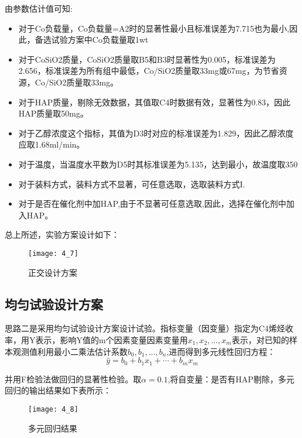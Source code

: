 \documentclass[withoutpreface,bwprint]{cumcmthesis} %
\begin{document}
由参数估计值可知:
\begin{itemize}
	\item 对于Co负载量，Co负载量=A2时的显著性最小且标准误差为7.715也为最小,因此，备选试验方案中Co负载量取1wt%
	\item 对于CoSiO2质量，CoSiO2质量取B5和B3时显著性为0.005，标准误差为2.656，标准误差为所有组中最低，Co/SiO2质量取33mg或67mg，为节省资源，Co/SiO2质量取33mg。
	
	\item 对于HAP质量，剔除无效数据，其值取C4时数据有效，显著性为0.83，因此HAP质量取50mg。
	
	\item 对于乙醇浓度这个指标，其值为D3时对应的标准误差为1.829，因此乙醇浓度应取1.68ml/min。
	
	\item 对于温度，当温度水平数为D5时其标准误差为5.135，达到最小，故温度取350
	
	\item 对于装料方式，装料方式不显著，可任意选取，选取装料方式I.
	
	\item 对于是否在催化剂中加HAP,由于不显著可任意选取,因此，选择在催化剂中加入HAP。	
\end{itemize}

总上所述，实验方案设计如下：
\begin{figure}[!h]
	\centering
	\texttt{[image: 4\_7]}
	\caption{正交设计方案}
	\label{fig:circuit-diagram1}
\end{figure}



\subsection{均匀试验设计方案}
思路二是采用均匀试验设计方案设计试验。指标变量（因变量）指定为C4烯烃收率，用Y表示，影响Y值的m个因素变量因素变量用$x_1,x_2,...,x_m$表示，对已知的样本观测值利用最小二乘法估计系数$b_0,b_1,...,b_n$,进而得到多元线性回归方程：
\begin{equation*}
	\hat{y}=b_{0}+b_{1} x_{1}+\cdots+b_{m} x_{m}
\end{equation*}

并用F检验法做回归的显著性检验。取$\alpha=0.1$,将自变量：是否有HAP剔除，多元回归的输出结果如下表所示：
\begin{figure}[!h]
	\centering
	\texttt{[image: 4\_8]}
	\caption{多元回归结果}
	\label{fig:circuit-diagram1}
\end{figure}
\end{document}
